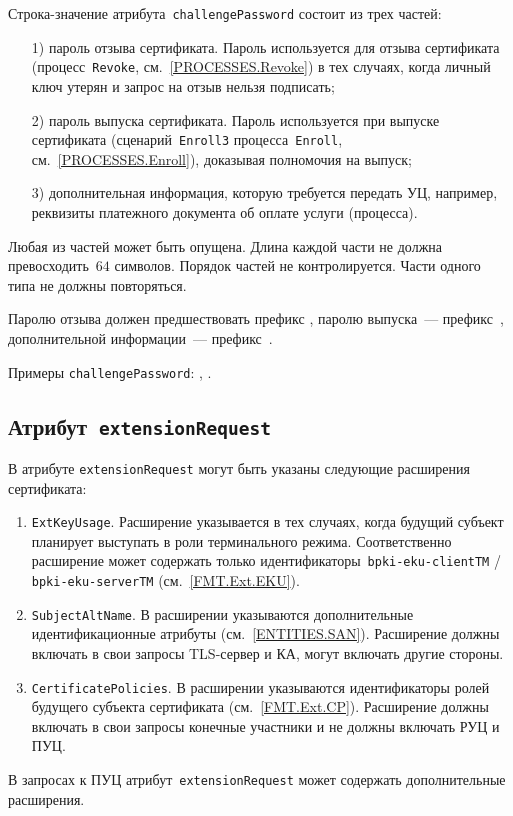 Строка-значение атрибута~\texttt{challengePassword} состоит из трех частей:
\begin{enumerate} 
\item[1)]
пароль отзыва сертификата. Пароль используется для отзыва сертификата
(процесс~\texttt{Revoke}, см.~\ref{PROCESSES.Revoke})
в тех случаях, когда личный ключ утерян и запрос на отзыв нельзя 
подписать;
\item[2)]
пароль выпуска сертификата. Пароль используется при выпуске сертификата
(сценарий~\texttt{Enroll3} процесса~\texttt{Enroll}, 
см.~\ref{PROCESSES.Enroll}), доказывая полномочия на выпуск;
\item[3)]
дополнительная информация, которую требуется передать УЦ,
например, реквизиты платежного документа об оплате услуги (процесса).
\end{enumerate}

Любая из частей может быть опущена. Длина каждой части не должна 
превосходить~$64$ символов. Порядок частей не контролируется.
Части одного типа не должны повторяться.

Паролю отзыва должен предшествовать префикс 
, паролю выпуска~--- префикс~,
дополнительной информации~--- префикс~.

Примеры \texttt{challengePassword}:
, .

\subsection{Атрибут~\texttt{extensionRequest}}\label{FMT.CSR.ER}

В атрибуте \texttt{extensionRequest} могут быть указаны следующие 
расширения сертификата:
\begin{enumerate}
\item 
\texttt{ExtKeyUsage}. Расширение указывается в тех случаях, 
когда будущий субъект планирует выступать в роли  
терминального режима. Соответственно расширение может содержать только 
идентификаторы~\verb|bpki-eku-clientTM| / \verb|bpki-eku-serverTM| 
(см.~\ref{FMT.Ext.EKU}). 


\item 
\texttt{SubjectAltName}. В расширении указываются 
дополнительные идентификационные атрибуты (см.~\ref{ENTITIES.SAN}). 
Расширение должны включать в свои запросы TLS-сервер и КА,
могут включать другие стороны.

\item
\texttt{CertificatePolicies}. В расширении
указываются идентификаторы ролей будущего субъекта сертификата
(см.~\ref{FMT.Ext.CP}).
Расширение должны включать в свои запросы конечные участники 
и не должны включать РУЦ и ПУЦ.
\end{enumerate}

В запросах к ПУЦ атрибут~\texttt{extensionRequest} может содержать 
дополнительные расширения.
